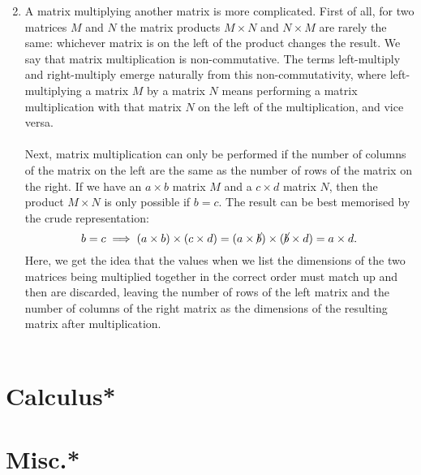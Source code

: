 \begin{enumerate}
$$    $$
    \item A matrix multiplying another matrix is more complicated. First of all, for two matrices $M$ and $N$ the matrix products $M\times N$ and $N\times M$ are rarely the same: whichever matrix is on the left of the product changes the result. We say that matrix multiplication is non-commutative. The terms left-multiply and right-multiply emerge naturally from this non-commutativity, where left-multiplying a matrix $M$ by a matrix $N$ means performing a matrix multiplication with that matrix $N$ on the left of the multiplication, and vice versa.
    \\\\
    Next, matrix multiplication can only be performed if the number of columns of the matrix on the left are the same as the number of rows of the matrix on the right. If we have an $a\times b$ matrix $M$ and a $c\times d$ matrix $N$, then the product $M\times N$ is only possible if $b=c$. The result can be best memorised by the crude representation:
    $$
    b=c\implies
    (a\times b) \times (c \times d) = (a\times \cancel{b}) \times (\cancel{b} \times d) = a\times d.
    $$
    Here, we get the idea that the  values when we list the dimensions of the two matrices being multiplied together in the correct order must match up and then are discarded, leaving the number of rows of the left matrix and the number of columns of the right matrix as the dimensions of the resulting matrix after multiplication.
    \\\\
    
\end{enumerate}
\section{Calculus*}
\section{Misc.*}